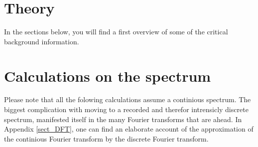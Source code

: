 \documentclass[12pt,a4paper]{article}
\numberwithin{equation}{section}
\numberwithin{figure}{section}
\numberwithin{table}{section}
\begin{document}
\newpage
\section{Theory}
In the sections below, you will find a first overview of some of the critical background information.






\newpage 
\section{Calculations on the spectrum} %
Please note that all the folowing calculations assume a continious spectrum. The biggest complication with moving to a recorded and therefor intrensicly discrete spectrum, manifested itself in the many Fourier transforms that are ahead. In Appendix \ref{sect_DFT}, one can find an elaborate account of the approximation of the continious Fourier transform by the discrete Fourier transform.
\label{sec:calculations_on_the_spectrum}




\vspace{2cm}
%
%
\newpage
\printbibliography
%
%
%
\newpage
\appendix
\appendixpage
\addappheadtotoc



\end{document}
